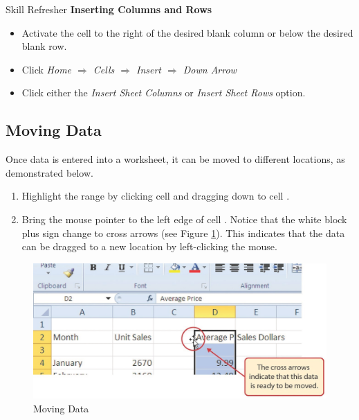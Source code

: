 \begin{center}
	\begin{sklbox}{Skill Refresher}
		\textbf{Inserting Columns and Rows}
		\\
		\begin{itemize}
			\setlength{\itemsep}{0pt}
			\setlength{\parskip}{0pt}
			\setlength{\parsep}{0pt}
			
			\item Activate the cell to the right of the desired blank column or below the desired blank row.
			\item Click \textit{Home $ \Rightarrow $ Cells $ \Rightarrow $ Insert $ \Rightarrow $ Down Arrow}
			\item Click either the \textit{Insert Sheet Columns} or \textit{Insert Sheet Rows} option.
			
		\end{itemize}
	\end{sklbox}
\end{center}

\subsection{Moving Data}

Once data is entered into a worksheet, it can be moved to different locations, as demonstrated below.

\begin{enumerate}
	\item Highlight the range  by clicking cell  and dragging down to cell .
	\item Bring the mouse pointer to the left edge of cell . Notice that the white block plus sign change to cross arrows (see Figure \ref{01:fig30}). This indicates that the data can be dragged to a new location by left-clicking the mouse.
\end{enumerate}

\begin{figure}[H]
	\centering
	\includegraphics[width=\maxwidth{.95\linewidth}]{gfx/ch01_fig30}
	\caption{Moving Data}
	\label{01:fig30}
\end{figure}

